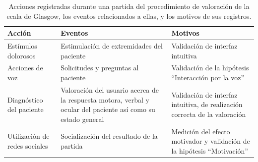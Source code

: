 \begin{table}[H]
\centering
\begin{tabulary}{\textwidth}{|L|L|L|}
\hline
Acción & Eventos & Motivos \\
\hline
Estímulos dolorosos & Estimulación de extremidades del paciente & Validación de interfaz intuitiva \\
\hline
Acciones de voz  & Solicitudes y preguntas al paciente & Validación de la hipótesis \enquote{Interacción 
por la voz} \\
\hline
Diagnóstico del paciente & Valoración del usuario acerca de la respuesta motora, verbal y ocular 
del paciente así como su estado general & Validación de interfaz intuitiva, de realización correcta de 
la valoración \\
\hline
Utilización de redes sociales & Socialización del resultado de la partida & Medición del efecto motivador 
y validación de la hipótesis \enquote{Motivación}\\
\hline
\end{tabulary}
\caption{Acciones registradas durante una partida del procedimiento de valoración de la ecala 
de Glasgow, los eventos relacionados a ellas, y los motivos de sus registros.}
\label{tab:glasgow_registro}
\end{table}



%
%

